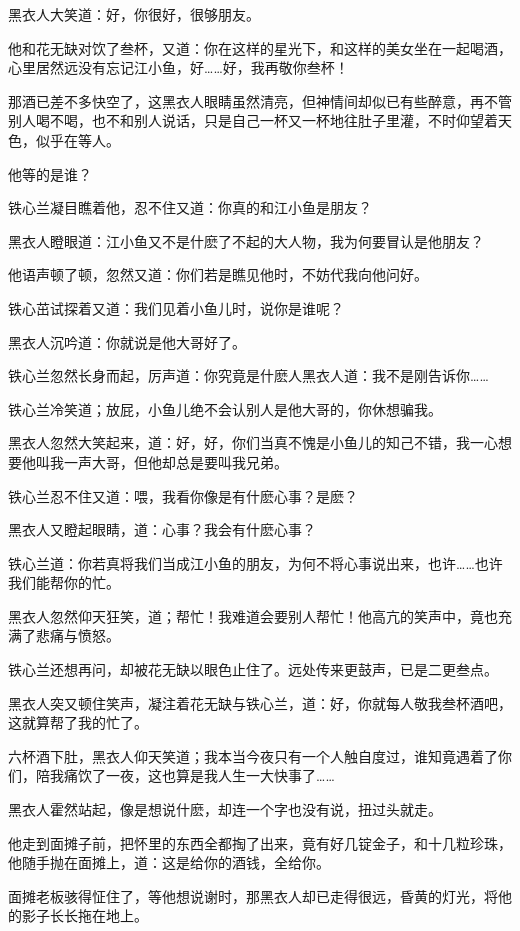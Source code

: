 \documentclass[12pt,oneside]{book}
\begin{document}
黑衣人大笑道：好，你很好，很够朋友。

他和花无缺对饮了叁杯，又道：你在这样的星光下，和这样的美女坐在一起喝酒，心里居然远没有忘记江小鱼，好\ldots\ldots 好，我再敬你叁杯！

那酒已差不多快空了，这黑衣人眼睛虽然清亮，但神情间却似已有些醉意，再不管别人喝不喝，也不和别人说话，只是自己一杯又一杯地往肚子里灌，不时仰望着天色，似乎在等人。

他等的是谁？

铁心兰凝目瞧着他，忍不住又道：你真的和江小鱼是朋友？

黑衣人瞪眼道：江小鱼又不是什麽了不起的大人物，我为何要冒认是他朋友？

他语声顿了顿，忽然又道：你们若是瞧见他时，不妨代我向他问好。

铁心茁试探着又道：我们见着小鱼儿时，说你是谁呢？

黑衣人沉吟道：你就说是他大哥好了。

铁心兰忽然长身而起，厉声道：你究竟是什麽人黑衣人道：我不是刚告诉你\ldots\ldots{}

铁心兰冷笑道；放屁，小鱼儿绝不会认别人是他大哥的，你休想骗我。

黑衣人忽然大笑起来，道：好，好，你们当真不愧是小鱼儿的知己不错，我一心想要他叫我一声大哥，但他却总是要叫我兄弟。

铁心兰忍不住又道：喂，我看你像是有什麽心事？是麽？

黑衣人又瞪起眼睛，道：心事？我会有什麽心事？

铁心兰道：你若真将我们当成江小鱼的朋友，为何不将心事说出来，也许\ldots\ldots 也许我们能帮你的忙。

黑衣人忽然仰天狂笑，道；帮忙！我难道会要别人帮忙！他高亢的笑声中，竟也充满了悲痛与愤怒。

铁心兰还想再问，却被花无缺以眼色止住了。远处传来更鼓声，已是二更叁点。

黑衣人突又顿住笑声，凝注着花无缺与铁心兰，道：好，你就每人敬我叁杯酒吧，这就算帮了我的忙了。

六杯酒下肚，黑衣人仰天笑道；我本当今夜只有一个人触自度过，谁知竟遇着了你们，陪我痛饮了一夜，这也算是我人生一大快事了\ldots\ldots{}

黑衣人霍然站起，像是想说什麽，却连一个字也没有说，扭过头就走。

他走到面摊子前，把怀里的东西全都掏了出来，竟有好几锭金子，和十几粒珍珠，他随手抛在面摊上，道：这是给你的酒钱，全给你。

面摊老板骇得怔住了，等他想说谢时，那黑衣人却已走得很远，昏黄的灯光，将他的影子长长拖在地上。
\end{document}
